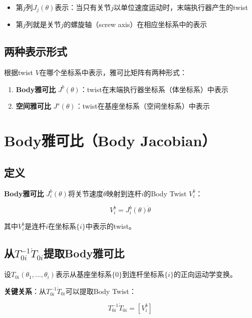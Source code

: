 \documentclass[12pt,a4paper]{article}
\begin{document}
\begin{itemize}
\item 第$j$列$J_j(\theta)$表示：当只有关节$j$以单位速度运动时，末端执行器产生的twist
\item 第$j$列就是关节$j$的螺旋轴（screw axis）在相应坐标系中的表示
\end{itemize}

\subsection{两种表示形式}

根据twist $V$在哪个坐标系中表示，雅可比矩阵有两种形式：

\begin{enumerate}
\item \textbf{Body雅可比} $J^b(\theta)$：twist在末端执行器坐标系（体坐标系）中表示
\item \textbf{空间雅可比} $J^s(\theta)$：twist在基座坐标系（空间坐标系）中表示
\end{enumerate}

\section{Body雅可比（Body Jacobian）}

\subsection{定义}

\textbf{Body雅可比} $J_i^b(\theta)$将关节速度$\dot{\theta}$映射到连杆$i$的Body Twist $V_i^b$：

\begin{equation}
V_i^b = J_i^b(\theta) \dot{\theta}
\label{eq:body_jacobian_def}
\end{equation}

其中$V_i^b$是连杆$i$在坐标系$\{i\}$中表示的twist。

\subsection{从$T_{0i}^{-1}\dot{T}_{0i}$提取Body雅可比}

设$T_{0i}(\theta_1, \ldots, \theta_i)$表示从基座坐标系$\{0\}$到连杆坐标系$\{i\}$的正向运动学变换。

\textbf{关键关系}：从$T_{0i}^{-1}\dot{T}_{0i}$可以提取Body Twist：

\begin{equation}
T_{0i}^{-1} \dot{T}_{0i} = [V_i^b]
\label{eq:T_inv_T_dot}
\end{equation}
\end{document}
